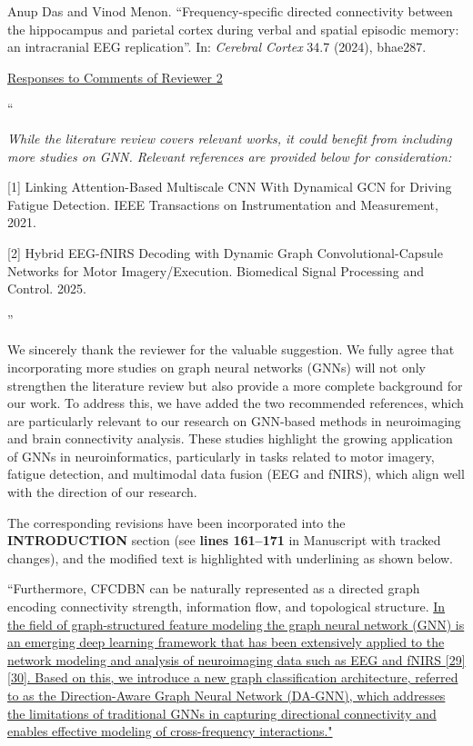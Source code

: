 \documentclass[12pt,technote,onecolumn]{IEEEtran}
\begin{document}
\noindent[51]\:Anup Das and Vinod Menon. ``Frequency-specific directed connectivity between the hippocampus and parietal cortex during verbal and spatial episodic memory: an intracranial EEG replication”. In: \textit{Cerebral Cortex} 34.7 (2024), bhae287.




\newpage
\clearpage
\begin{center}
\underline{Responses to Comments of Reviewer 2}
\end{center}
\vspace{3mm}

 ``{\it While the literature review covers relevant works, it could benefit from including more studies on GNN. Relevant references are provided below for consideration:

[1] Linking Attention-Based Multiscale CNN With Dynamical GCN for Driving Fatigue Detection. IEEE Transactions on Instrumentation and Measurement, 2021.

[2] Hybrid EEG-fNIRS Decoding with Dynamic Graph Convolutional-Capsule Networks for Motor Imagery/Execution. Biomedical Signal Processing and Control. 2025.}''
\vspace{1mm}


We sincerely thank the reviewer for the valuable suggestion. We fully agree that incorporating more studies on graph neural networks (GNNs) will not only strengthen the literature review but also provide a more complete background for our work. To address this, we have added the two recommended references, which are particularly relevant to our research on GNN-based methods in neuroimaging and brain connectivity analysis. These studies highlight the growing application of GNNs in neuroinformatics, particularly in tasks related to motor imagery, fatigue detection, and multimodal data fusion (EEG and fNIRS), which align well with the direction of our research.

The corresponding revisions have been incorporated into the \textbf{INTRODUCTION} section (see \textbf{lines 161–171} in Manuscript with tracked changes), and the modified text is highlighted with underlining as shown below.

``Furthermore, CFCDBN can be naturally represented as a directed graph encoding connectivity strength, information flow, and topological structure.
\uline{In the field of graph-structured feature modeling the graph neural network (GNN) is an emerging deep learning framework that has been extensively applied to the network modeling and analysis of neuroimaging data such as EEG and fNIRS [29] [30]. Based on this, we introduce a new graph classification architecture, referred to as the Direction-Aware Graph Neural Network (DA-GNN), which addresses the limitations of traditional GNNs in capturing directional connectivity and enables effective modeling of cross-frequency interactions."} 
\end{document}

